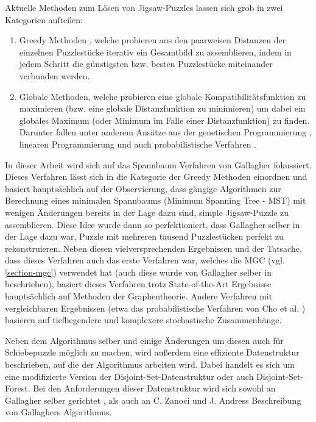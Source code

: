 \documentclass{whswinvcbook}
\begin{document}
Aktuelle Methoden zum Lösen von Jigsaw-Puzzles lassen sich grob in zwei Kategorien aufteilen:
\begin{enumerate}
    \item Greedy Methoden \cite{loop,pomeranz,gallagher}, welche probieren aus den paarweisen Distanzen der einzelnen Puzzlestücke iterativ ein Gesamtbild zu assemblieren, indem in jedem Schritt die günstigsten bzw. besten Puzzlestücke miteinander verbunden werden.
    \item Globale Methoden, welche probieren eine globale Kompatibilitätsfunktion zu maximieren (bzw. eine globale Distanzfunktion zu minimieren) um dabei ein globales Maximum (oder Minimum im Falle einer Distanzfunktion) zu finden. Darunter fallen unter anderem Ansätze aus der genetischen Programmierung \cite{genetic}, linearen Programmierung \cite{linear} und auch probabilistische Verfahren \cite{cho}.
\end{enumerate}
In dieser Arbeit wird sich auf das Spannbaum Verfahren von Gallagher \cite{gallagher} fokussiert. Dieses Verfahren lässt sich in die Kategorie der Greedy Methoden einordnen und basiert hauptsächlich auf der Observierung, dass gängige Algorithmen zur Berechnung eines minimalen Spannbaums (Minimum Spanning Tree - MST) mit wenigen Änderungen bereits in der Lage dazu sind, simple Jigsaw-Puzzle zu assemblieren. Diese Idee wurde dann so perfektioniert, dass Gallagher selber in der Lage dazu war, Puzzle mit mehreren tausend Puzzlestücken perfekt zu rekonstruieren. Neben diesen vielversprechenden Ergebnissen und der Tatsache, dass dieses Verfahren auch das erste Verfahren war, welches die MGC (vgl. \ref{section-mgc}) verwendet hat (auch diese wurde von Gallagher selber in \cite{gallagher} beschrieben), basiert dieses Verfahren trotz State-of-the-Art Ergebnisse hauptsächlich auf Methoden der Graphentheorie. Andere Verfahren mit vergleichbaren Ergebnissen (etwa das probabilistische Verfahren von Cho et al. \cite{cho}) basieren auf tiefliegendere und komplexere stochastische Zusammenhänge.

Neben dem Algorithmus selber und einige Änderungen um diesen auch für Schiebepuzzle möglich zu machen, wird außerdem eine effiziente Datenstruktur beschrieben, auf die der Algorithmus arbeiten wird. Dabei handelt es sich um eine modifizierte Version der Disjoint-Set-Datenstruktur oder auch Disjoint-Set-Forest.\cite{dsf} Bei den Anforderungen dieser Datenstruktur wird sich sowohl an Gallagher selber gerichtet \cite{gallagher}, als auch an C. Zanoci und J. Andress Beschreibung von Gallaghers Algorithmus.\cite{crisjim}
\end{document}
